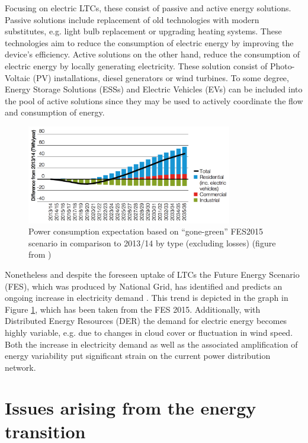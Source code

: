 Focusing on electric LTCs, these consist of passive and active energy solutions.
Passive solutions include replacement of old technologies with modern substitutes, e.g. light bulb replacement or upgrading heating systems.
These technologies aim to reduce the consumption of electric energy by improving the device's efficiency.
Active solutions on the other hand, reduce the consumption of electric energy by locally generating electricity.
These solution consist of Photo-Voltaic (PV) installations, diesel generators or wind turbines.
To some degree, Energy Storage Solutions (ESSs) and Electric Vehicles (EVs) can be included into the pool of active solutions since they may be used to actively coordinate the flow and consumption of energy.

\begin{figure}[htb]
	\centering
	\includegraphics[width=0.8\textwidth]{_introduction/gone-green-power-change-2014-onwards}
	\caption{Power consumption expectation based on ``gone-green'' FES2015 scenario in
comparison to 2013/14 by type (excluding losses) (figure from \cite{FES2015})}
	\label{fig-gone-green-power-change}
\end{figure}

Nonetheless and despite the foreseen uptake of LTCs the Future Energy Scenario (FES), which was produced by National Grid, has identified and predicts an ongoing increase in electricity demand \cite{FES2015}.
This trend is depicted in the graph in Figure \ref{fig-gone-green-power-change}, which has been taken from the FES 2015.
Additionally, with Distributed Energy Resources (DER) the demand for electric energy becomes highly variable, e.g. due to changes in cloud cover or fluctuation in wind speed.
Both the increase in electricity demand as well as the associated amplification of energy variability put significant strain on the current power distribution network.

\section{Issues arising from the energy transition}

